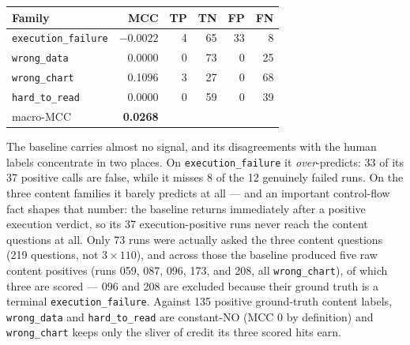\documentclass[11pt]{article}
\begin{document}
\begin{center}
\begin{tabular}{lrrrrr}
\toprule
Family & MCC & TP & TN & FP & FN \\
\midrule
\texttt{execution\_failure} & $-0.0022$ & 4 & 65 & 33 & 8 \\
\texttt{wrong\_data} & 0.0000 & 0 & 73 & 0 & 25 \\
\texttt{wrong\_chart} & 0.1096 & 3 & 27 & 0 & 68 \\
\texttt{hard\_to\_read} & 0.0000 & 0 & 59 & 0 & 39 \\
\midrule
macro-MCC & \textbf{0.0268} & & & & \\
\bottomrule
\end{tabular}
\end{center}

The baseline carries almost no signal, and its disagreements with the human
labels concentrate in two places. On \texttt{execution\_failure} it
\emph{over}-predicts: 33 of its 37 positive calls are false, while it misses
8 of the 12 genuinely failed runs. On the three content families it barely
predicts at all --- and an important control-flow fact shapes that number:
the baseline returns immediately after a positive execution verdict, so its
37 execution-positive runs never reach the content questions at all. Only
73 runs were actually asked the three content questions (219 questions, not
$3\times110$), and across those the baseline produced five raw content
positives (runs 059, 087, 096, 173, and 208, all \texttt{wrong\_chart}), of
which three are scored --- 096 and 208 are excluded because their ground
truth is a terminal \texttt{execution\_failure}. Against 135 positive
ground-truth content labels, \texttt{wrong\_data} and
\texttt{hard\_to\_read} are constant-NO (MCC 0 by definition) and
\texttt{wrong\_chart} keeps only the sliver of credit its three scored hits
earn.
\end{document}
